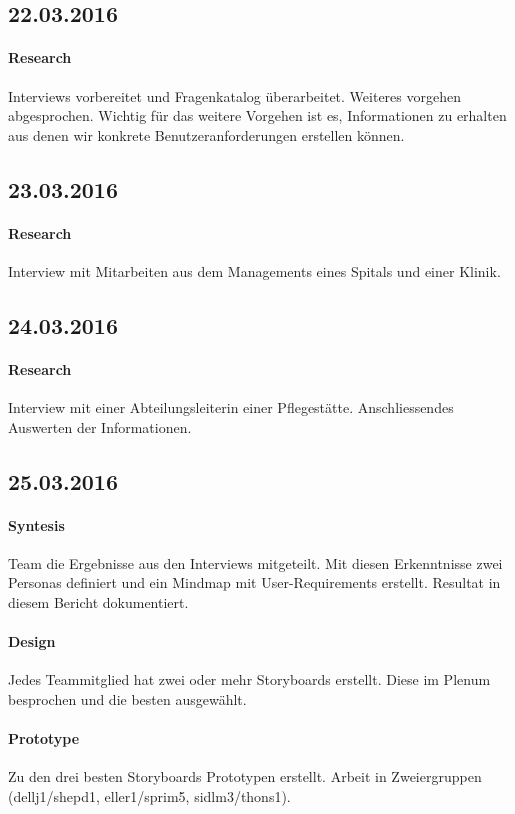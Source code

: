 \documentclass[a4paper]{scrreprt}
\begin{document}
\subsection*{22.03.2016}
\paragraph{Research}
Interviews vorbereitet und Fragenkatalog überarbeitet. Weiteres vorgehen abgesprochen. Wichtig für das weitere Vorgehen ist es, Informationen zu erhalten aus denen wir konkrete Benutzeranforderungen erstellen können.


\subsection*{23.03.2016}
\paragraph{Research}
Interview mit Mitarbeiten aus dem Managements eines Spitals und einer Klinik.


\subsection*{24.03.2016}
\paragraph{Research}
Interview mit einer Abteilungsleiterin einer Pflegestätte. Anschliessendes Auswerten der Informationen.

\subsection*{25.03.2016}
\paragraph{Syntesis}
Team die Ergebnisse aus den Interviews mitgeteilt. Mit diesen Erkenntnisse zwei Personas definiert und ein Mindmap mit User-Requirements erstellt. Resultat in diesem Bericht dokumentiert.

\paragraph{Design}
Jedes Teammitglied hat zwei oder mehr Storyboards erstellt. Diese im Plenum besprochen und die besten ausgewählt. 

\paragraph{Prototype}
Zu den drei besten Storyboards Prototypen erstellt. Arbeit in Zweiergruppen (dellj1/shepd1, eller1/sprim5, sidlm3/thons1).
\end{document}
